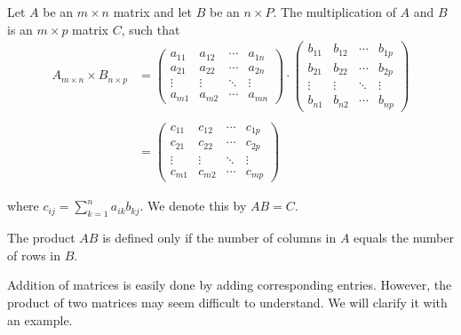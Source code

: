 	\begin{definition}\label{def:matrixproduct}
		Let $A$ be an $m\times n$ matrix and let $B$ be an $n\times P$. The multiplication of $A$ and $B$ is an $m \times p$ matrix $C$, such that
		\begin{align*}
		{A_{m \times n}} \times {B_{n \times p}} &= \begin{pmatrix}
			{{a_{11}}}&{{a_{12}}}& \cdots &{{a_{1n}}}\\
			{{a_{21}}}&{{a_{22}}}& \cdots &{{a_{2n}}}\\
			\vdots & \vdots & \ddots & \vdots \\
			{{a_{m1}}}&{{a_{m2}}}& \cdots &{{a_{mn}}}
				\end{pmatrix} \cdot \begin{pmatrix}
			{{b_{11}}}&{{b_{12}}}& \cdots &{{b_{1p}}}\\
			{{b_{21}}}&{{b_{22}}}& \cdots &{{b_{2p}}}\\
			\vdots & \vdots & \ddots & \vdots \\
			{{b_{n1}}}&{{b_{n2}}}& \cdots &{{b_{np}}}
			\end{pmatrix}\\
		\\
		&= \begin{pmatrix}
			{{c_{11}}}&{{c_{12}}}& \cdots &{{c_{1p}}}\\
			{{c_{21}}}&{{c_{22}}}& \cdots &{{c_{2p}}}\\
			\vdots & \vdots & \ddots & \vdots \\
			{{c_{m1}}}&{{c_{m2}}}& \cdots &{{c_{mp}}}
		\end{pmatrix}
		\end{align*}

		where $c_{ij}= \displaystyle\sum_{k=1}^{n} a_{ik}b_{kj}$. We denote this by $AB=C$.
	\end{definition}


	\begin{note}
		The product $AB$ is defined only if the number of columns in $A$ equals the number of rows in $B$.
	\end{note}


Addition of matrices is easily done by adding corresponding entries. However, the product of two matrices may seem difficult to understand. We will clarify it with an example.

